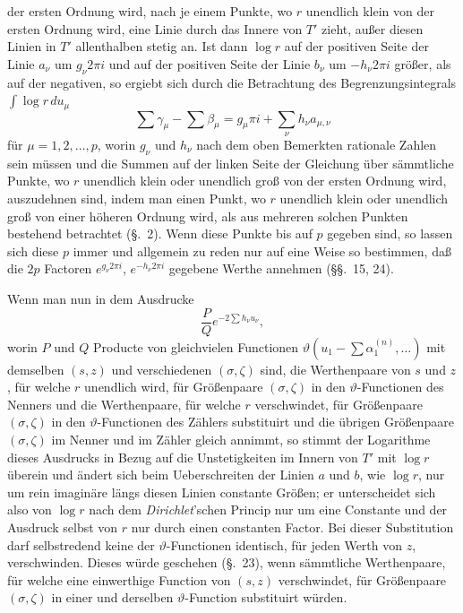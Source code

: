 \documentclass{article}
\begin{document}
der ersten Ordnung wird, nach je einem Punkte, wo $r$ unendlich klein von der ersten Ordnung wird, eine Linie durch das Innere von $T'$ zieht, außer diesen Linien in $T'$ allenthalben stetig an. Ist dann $\log r$ auf der positiven Seite der Linie $a_{\nu}$ um $g_{\nu} 2\pi i$ und auf der positiven Seite der Linie $b_{\nu}$ um $-h_{\nu} 2\pi i$ größer, als auf der negativen, so ergiebt sich durch die Betrachtung des Begrenzungsintegrals $\displaystyle\int \log r\, du_{\mu}$
\[ \sum \gamma_{\mu} - \sum \beta_{\mu} = g_{\mu}\pi i + \sum_{\nu} h_{\nu} a_{\mu,\nu} \]
für $\mu = 1, 2, \ldots, p$, worin $g_{\nu}$ und $h_{\nu}$ nach dem oben Bemerkten rationale Zahlen sein müssen und die Summen auf der linken Seite der Gleichung über sämmtliche Punkte, wo $r$ unendlich klein oder unendlich groß von der ersten Ordnung wird, auszudehnen sind, indem man einen Punkt, wo $r$ unendlich klein oder unendlich groß von einer höheren Ordnung wird, als aus mehreren solchen Punkten bestehend betrachtet (§.~2). Wenn diese Punkte bis auf $p$ gegeben sind, so lassen sich diese $p$ immer und allgemein zu reden nur auf eine Weise so bestimmen, daß die $2p$ Factoren $e^{g_{\nu} 2\pi i}$, $e^{-h_{\nu} 2\pi i}$ gegebene Werthe annehmen (§§.~15, 24).

Wenn man nun in dem Ausdrucke
\[ \frac{P}{Q} e^{-2 \sum h_{\nu} u_{\nu}}, \]
worin $P$ und $Q$ Producte von gleichvielen Functionen $\vartheta\left(u_{1} - \displaystyle\sum \alpha_{1}^{(n)}, \ldots\right)$ mit demselben $(s, z)$ und verschiedenen $(\sigma, \zeta)$ sind, die Werthenpaare von $s$ und $z$, für welche $r$ unendlich wird, für Größenpaare $(\sigma, \zeta)$ in den $\vartheta$-Functionen des Nenners und die Werthenpaare, für welche $r$ verschwindet, für Größenpaare $(\sigma, \zeta)$ in den $\vartheta$-Functionen des Zählers substituirt und die übrigen Größenpaare $(\sigma, \zeta)$ im Nenner und im Zähler gleich annimmt, so stimmt der Logarithme dieses Ausdrucks in Bezug auf die Unstetigkeiten im Innern von $T'$ mit $\log r$ überein und ändert sich beim Ueberschreiten der Linien $a$ und $b$, wie $\log r$, nur um rein imaginäre längs diesen Linien constante Größen; er unterscheidet sich also von $\log r$ nach dem \emph{Dirichlet}'schen Princip nur um eine Constante und der Ausdruck selbst von $r$ nur durch einen constanten Factor. Bei dieser Substitution darf selbstredend keine der $\vartheta$-Functionen identisch, für jeden Werth von $z$, verschwinden. Dieses würde geschehen (§.~23), wenn sämmtliche Werthenpaare, für welche eine einwerthige Function von $(s, z)$ verschwindet, für Größenpaare $(\sigma, \zeta)$ in einer und derselben $\vartheta$-Function substituirt würden.
\end{document}
